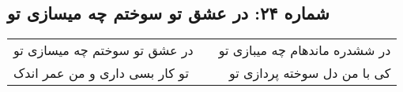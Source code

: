 \begin{center}
\section*{شماره ۲۴: در عشق تو سوختم چه  میسازی تو}
\label{sec:024}
\begin{longtable}{l p{0.5cm} r}
در عشق تو سوختم چه میسازی تو
&&
در ششدره ماندهام چه میبازی تو
\\
تو کار بسی داری و من عمر اندک
&&
کی با من دل سوخته پردازی تو
\\
\end{longtable}
\end{center}
